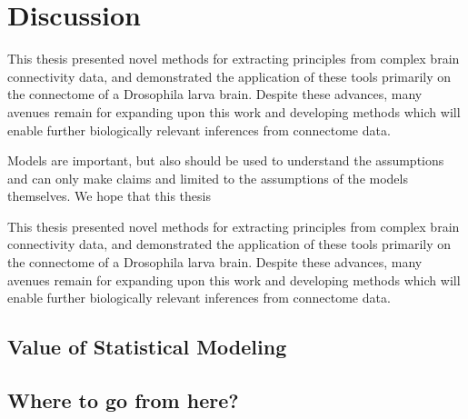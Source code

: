 \chapter{Discussion}\label{chap:discussion}

This thesis presented novel methods for extracting principles from complex brain connectivity data, and demonstrated the application of these tools primarily on the connectome of a Drosophila larva brain. Despite these advances, many avenues remain for expanding upon this work and developing methods which will enable further biologically relevant inferences from connectome data.


Models are important, but also should be used to understand the assumptions and can only make claims and limited to the assumptions of the models themselves. We hope that this thesis

This thesis presented novel methods for extracting principles from complex brain connectivity data, and demonstrated the application of these tools primarily on the connectome of a Drosophila larva brain. Despite these advances, many avenues remain for expanding upon this work and developing methods which will enable further biologically relevant inferences from connectome data.




\section{Value of Statistical Modeling}
\blindtext

\section{Where to go from here?}
\blindtext